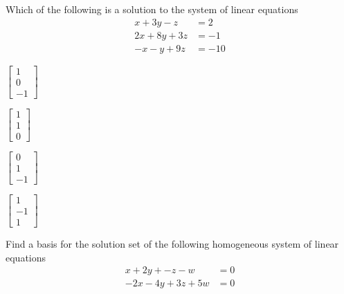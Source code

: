 \documentclass{article}
\begin{document}
\begin{readinessAssuranceTest}
\setcounter{enumi}{30}
\item Which of the following is a solution to the system of linear equations
      \begin{align*}
      x+3y-z    &=   2 \\
      2x+8y+3z  &=  -1 \\
      -x-y+9z   &= -10
      \end{align*}

\begin{multicols}{4}
\begin{readinessAssuranceTestChoices}
\item $\begin{bmatrix} 1 \\ 0 \\ -1 \end{bmatrix}$
\item $\begin{bmatrix} 1 \\ 1 \\ 0 \end{bmatrix}$
\item $\begin{bmatrix} 0 \\ 1 \\ -1 \end{bmatrix}$
\item $\begin{bmatrix} 1 \\ -1 \\ 1 \end{bmatrix}$
\end{readinessAssuranceTestChoices}
\end{multicols}


\item Find a basis for the solution set of the following homogeneous system of
      linear equations
      \begin{align*}
      x+2y+-z-w    &= 0 \\
      -2x-4y+3z+5w &= 0
      \end{align*}


\end{readinessAssuranceTest}
\end{document}
